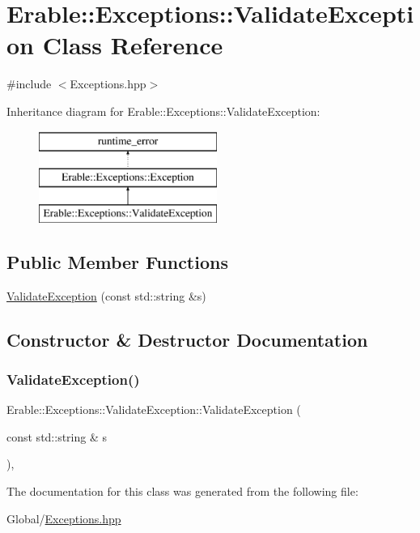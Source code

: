 \hypertarget{class_erable_1_1_exceptions_1_1_validate_exception}{}\section{Erable\+::Exceptions\+::Validate\+Exception Class Reference}
\label{class_erable_1_1_exceptions_1_1_validate_exception}


{\ttfamily \#include $<$Exceptions.\+hpp$>$}

Inheritance diagram for Erable\+::Exceptions\+::Validate\+Exception\+:\begin{figure}[H]
\begin{center}
\leavevmode
\includegraphics[height=3.000000cm]{class_erable_1_1_exceptions_1_1_validate_exception}
\end{center}
\end{figure}
\subsection*{Public Member Functions}
\begin{DoxyCompactItemize}
\item 
\mbox{\hyperlink{class_erable_1_1_exceptions_1_1_validate_exception_adfa8dbb4c0edaa8875e45d66be75456a}{Validate\+Exception}} (const std\+::string \&s)
\end{DoxyCompactItemize}


\subsection{Constructor \& Destructor Documentation}
\mbox{\label{class_erable_1_1_exceptions_1_1_validate_exception_adfa8dbb4c0edaa8875e45d66be75456a}} 
\subsubsection{\texorpdfstring{ValidateException()}{ValidateException()}}
{\footnotesize\ttfamily Erable\+::\+Exceptions\+::\+Validate\+Exception\+::\+Validate\+Exception (\begin{DoxyParamCaption}\item[{const std\+::string \&}]{s }\end{DoxyParamCaption})\hspace{0.3cm}{\ttfamily [inline]}, {\ttfamily [explicit]}}



The documentation for this class was generated from the following file\+:\begin{DoxyCompactItemize}
\item 
Global/\mbox{\hyperlink{_exceptions_8hpp}{Exceptions.\+hpp}}\end{DoxyCompactItemize}
